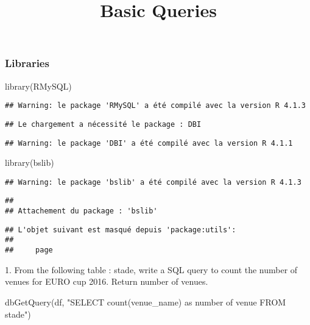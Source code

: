 \documentclass[
]{article}
\title{Basic Queries}
\author{}
\date{\vspace{-2.5em}}
\newenvironment{Shaded}{\begin{snugshade}}{\end{snugshade}}
\newcommand{\FunctionTok}[1]{\textcolor[rgb]{0.00,0.00,0.00}{#1}}
\newcommand{\NormalTok}[1]{#1}
\newcommand{\StringTok}[1]{\textcolor[rgb]{0.31,0.60,0.02}{#1}}
\begin{document}
\maketitle

\hypertarget{libraries}{%
\subsubsection{Libraries}\label{libraries}}

\begin{Shaded}
\begin{Highlighting}[]
\FunctionTok{library}\NormalTok{(RMySQL)}
\end{Highlighting}
\end{Shaded}

\begin{verbatim}
## Warning: le package 'RMySQL' a été compilé avec la version R 4.1.3
\end{verbatim}

\begin{verbatim}
## Le chargement a nécessité le package : DBI
\end{verbatim}

\begin{verbatim}
## Warning: le package 'DBI' a été compilé avec la version R 4.1.1
\end{verbatim}

\begin{Shaded}
\begin{Highlighting}[]
\FunctionTok{library}\NormalTok{(bslib)}
\end{Highlighting}
\end{Shaded}

\begin{verbatim}
## Warning: le package 'bslib' a été compilé avec la version R 4.1.3
\end{verbatim}

\begin{verbatim}
## 
## Attachement du package : 'bslib'
\end{verbatim}

\begin{verbatim}
## L'objet suivant est masqué depuis 'package:utils':
## 
##     page
\end{verbatim}

1. From the following table : stade, write a SQL query to count the
number of venues for EURO cup 2016. Return number of venues.

\begin{Shaded}
\begin{Highlighting}[]
\FunctionTok{dbGetQuery}\NormalTok{(df, }\StringTok{"SELECT count(venue\_name) as \textquotesingle{}number of venue\textquotesingle{}}
\StringTok{                FROM stade"}\NormalTok{)}
\end{Highlighting}
\end{Shaded}
\end{document}
